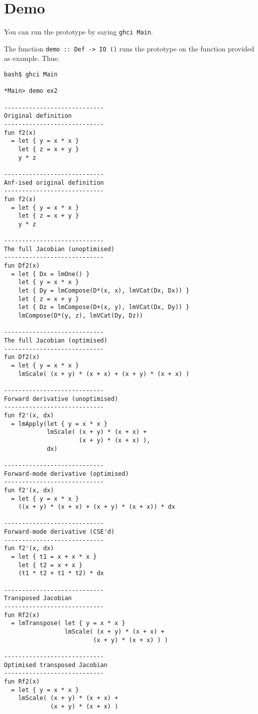 \documentclass[sigplan,review]{acmart}
\begin{document}
\section{Demo}

You can run the prototype by saying {\tt ghci Main}.

The function {\tt demo :: Def -> IO ()} runs the
prototype on the function provided as example.
Thus:
{\small
\begin{verbatim}
bash$ ghci Main

*Main> demo ex2

----------------------------
Original definition
----------------------------
fun f2(x)
  = let { y = x * x }
    let { z = x + y }
    y * z

----------------------------
Anf-ised original definition
----------------------------
fun f2(x)
  = let { y = x * x }
    let { z = x + y }
    y * z

----------------------------
The full Jacobian (unoptimised)
----------------------------
fun Df2(x)
  = let { Dx = lmOne() }
    let { y = x * x }
    let { Dy = lmCompose(D*(x, x), lmVCat(Dx, Dx)) }
    let { z = x + y }
    let { Dz = lmCompose(D+(x, y), lmVCat(Dx, Dy)) }
    lmCompose(D*(y, z), lmVCat(Dy, Dz))

----------------------------
The full Jacobian (optimised)
----------------------------
fun Df2(x)
  = let { y = x * x }
    lmScale( (x + y) * (x + x) + (x + y) * (x + x) )

----------------------------
Forward derivative (unoptimised)
----------------------------
fun f2'(x, dx)
  = lmApply(let { y = x * x }
            lmScale( (x + y) * (x + x) +
                     (x + y) * (x + x) ),
            dx)

----------------------------
Forward-mode derivative (optimised)
----------------------------
fun f2'(x, dx)
  = let { y = x * x }
    ((x + y) * (x + x) + (x + y) * (x + x)) * dx

----------------------------
Forward-mode derivative (CSE'd)
----------------------------
fun f2'(x, dx)
  = let { t1 = x + x * x }
    let { t2 = x + x }
    (t1 * t2 + t1 * t2) * dx

----------------------------
Transposed Jacobian
----------------------------
fun Rf2(x)
  = lmTranspose( let { y = x * x }
                 lmScale( (x + y) * (x + x) +
                         (x + y) * (x + x) ) )

----------------------------
Optimised transposed Jacobian
----------------------------
fun Rf2(x)
  = let { y = x * x }
    lmScale( (x + y) * (x + x) +
             (x + y) * (x + x) )


\end{verbatim}}
\end{document}
